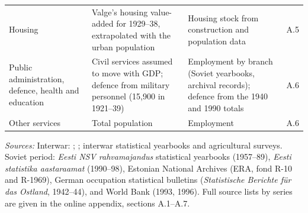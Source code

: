 \begin{table}[htbp]
\begin{threeparttable}
\begin{tabular}{>{\RaggedRight}p{2.6cm}>{\RaggedRight}p{5.3cm}>{\RaggedRight}p{5.3cm}c}
Housing & Valge's housing value-added for 1929--38, extrapolated with the urban population & Housing stock from construction and population data & A.5 \\
Public administration, defence, health and education & Civil services assumed to move with GDP; defence from military personnel (15,900 in 1921--39) & Employment by branch (Soviet yearbooks, archival records); defence from the 1940 and 1990 totals & A.6 \\
Other services & Total population & Employment & A.6 \\
\bottomrule
\end{tabular}
\begin{tablenotes}
\footnotesize
\textit{Sources:} Interwar: \cite{valge2003all}; \cite{klesment2007}; interwar statistical yearbooks and agricultural surveys. Soviet period: \textit{Eesti NSV rahvamajandus} statistical yearbooks (1957--89), \textit{Eesti statistika aastaraamat} (1990--98), Estonian National Archives (ERA, fond R-10 and R-1969), German occupation statistical bulletins (\textit{Statistische Berichte f\"ur das Ostland}, 1942--44), and World Bank (1993, 1996). Full source lists by series are given in the online appendix, sections A.1--A.7.
\end{tablenotes}
\end{threeparttable}
\end{table}

